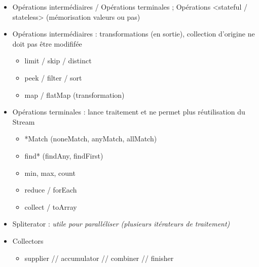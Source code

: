 \documentclass[11pt,twoside,a4paper]{article}
\begin{document}
\begin{landscape}
\begin{multicols}{2}
\begin{itemize}
\begin{itemize}
			\item[] Op{\'e}rations interm{\'e}diaires / Op{\'e}rations terminales ; Op{\'e}rations <stateful / stateless> (m{\'e}morisation valeurs ou pas)
			\item[] Op{\'e}rations interm{\'e}diaires : transformations (en sortie), collection d'origine ne doit pas {\^e}tre modifif{\'e}e
			\begin{itemize}
				\item[] limit / skip / distinct
				\item[] peek / filter / sort
				\item[] map / flatMap (transformation)
			\end{itemize}
			\item[] Op{\'e}rations terminales : lance traitement et ne permet plus r{\'e}utilisation du Stream
			\begin{itemize}
				\item[] *Match (noneMatch, anyMatch, allMatch)
				\item[] find* (findAny, findFirst)
				\item[] min, max, count
				\item[] reduce / forEach
				\item[] collect / toArray
			\end{itemize}
			\item[] Spliterator : \emph{utile pour parall{\'e}liser (plusieurs it{\'e}rateurs de traitement)}
			\item[] Collectors
			\begin{itemize}
				\item[] supplier // accumulator // combiner // finisher
			\end{itemize}
		\end{itemize}
	\end{itemize}
	
	\vfill
	
	\columnbreak
	

\end{multicols}
\end{landscape}
\end{document}
